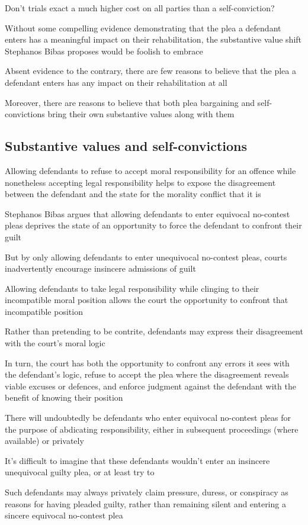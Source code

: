 Don't trials exact a much higher cost on all parties than a self-conviction?

Without some compelling evidence demonstrating that the plea a defendant enters has a meaningful impact on their rehabilitation, the substantive value shift Stephanos Bibas proposes would be foolish to embrace

Absent evidence to the contrary, there are few reasons to believe that the plea a defendant enters has any impact on their rehabilitation at all

Moreover, there are reasons to believe that both plea bargaining and self-convictions bring their own substantive values along with them

\subsection{Substantive values and self-convictions}

Allowing defendants to refuse to accept moral responsibility for an offence while nonetheless accepting legal responsibility helps to expose the disagreement between the defendant and the state for the morality conflict that it is

Stephanos Bibas argues that allowing defendants to enter equivocal no-contest pleas deprives the state of an opportunity to force the defendant to confront their guilt

But by only allowing defendants to enter unequivocal no-contest pleas, courts inadvertently encourage insincere admissions of guilt

Allowing defendants to take legal responsibility while clinging to their incompatible moral position allows the court the opportunity to confront that incompatible position

Rather than pretending to be contrite, defendants may express their disagreement with the court's moral logic

In turn, the court has both the opportunity to confront any errors it sees with the defendant's logic, refuse to accept the plea where the disagreement reveals viable excuses or defences, and enforce judgment against the defendant with the benefit of knowing their position

There will undoubtedly be defendants who enter equivocal no-contest pleas for the purpose of abdicating responsibility, either in subsequent proceedings (where available) or privately

It's difficult to imagine that these defendants wouldn't enter an insincere unequivocal guilty plea, or at least try to

Such defendants may always privately claim pressure, duress, or conspiracy as reasons for having pleaded guilty, rather than remaining silent and entering a sincere equivocal no-contest plea
